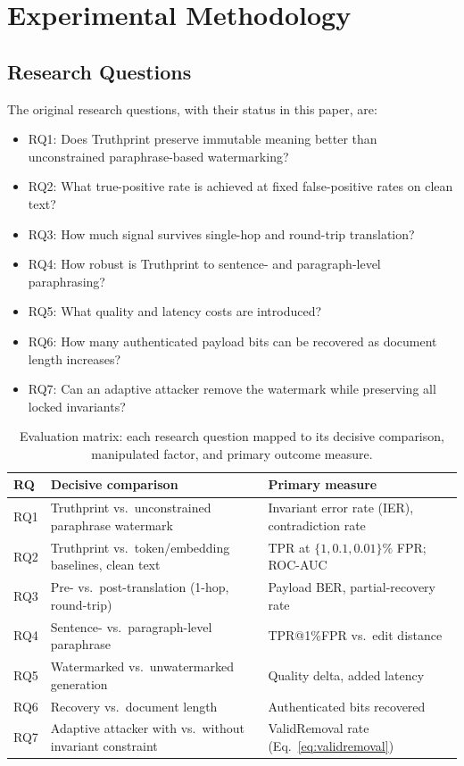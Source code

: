 \documentclass[11pt]{article}
\begin{document}
\section{Experimental Methodology}
\label{sec:eval}
\subsection{Research Questions}
The original research questions, with their status in this paper, are:
\begin{itemize}[leftmargin=*]
  \item RQ1: Does Truthprint preserve immutable meaning better than unconstrained paraphrase-based watermarking?
  \item RQ2: What true-positive rate is achieved at fixed false-positive rates on clean text?
  \item RQ3: How much signal survives single-hop and round-trip translation?
  \item RQ4: How robust is Truthprint to sentence- and paragraph-level paraphrasing?
  \item RQ5: What quality and latency costs are introduced?
  \item RQ6: How many authenticated payload bits can be recovered as document length increases?
  \item RQ7: Can an adaptive attacker remove the watermark while preserving all locked invariants?
\end{itemize}

\begin{table}[t]
\centering
\caption{Evaluation matrix: each research question mapped to its decisive comparison, manipulated factor, and primary outcome measure.}
\label{tab:matrix}
\renewcommand{\arraystretch}{1.15}
\small
\begin{tabularx}{\linewidth}{@{}l>{\raggedright\arraybackslash}X>{\raggedright\arraybackslash}X@{}}
\toprule
RQ & Decisive comparison & Primary measure \\
\midrule
RQ1 & Truthprint vs.\ unconstrained paraphrase watermark & Invariant error rate (IER), contradiction rate \\
RQ2 & Truthprint vs.\ token/embedding baselines, clean text & TPR at $\{1, 0.1, 0.01\}\%$ FPR; ROC-AUC \\
RQ3 & Pre- vs.\ post-translation (1-hop, round-trip) & Payload BER, partial-recovery rate \\
RQ4 & Sentence- vs.\ paragraph-level paraphrase & TPR@1\%FPR vs.\ edit distance \\
RQ5 & Watermarked vs.\ unwatermarked generation & Quality delta, added latency \\
RQ6 & Recovery vs.\ document length & Authenticated bits recovered \\
RQ7 & Adaptive attacker with vs.\ without invariant constraint & ValidRemoval rate (Eq.~\eqref{eq:validremoval}) \\
\bottomrule
\end{tabularx}
\end{table}
\end{document}
